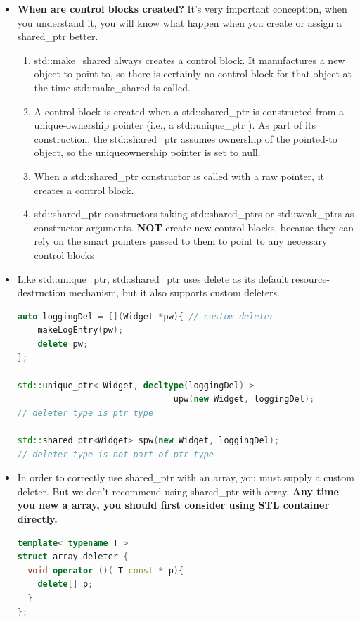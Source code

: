 \documentclass[a4paper,12pt,twoside]{book}
\begin{document}
\begin{itemize}
\item \textbf{When are control blocks created?}  It's very important conception, when you understand it, you will know what happen when you create or assign a shared\_ptr better. 
		
\begin{enumerate}
\item std::make\_shared  always creates a control block. It manufactures
a new object to point to, so there is certainly no control block for that
object at the time std::make\_shared is called.

\item A control block is created when a std::shared\_ptr is constructed from a
unique-ownership pointer (i.e., a std::unique\_ptr ). As part of its construction, the std::shared\_ptr assumes ownership of the pointed-to object, so the uniqueownership pointer is set to null.

\item When a std::shared\_ptr constructor is called with a raw pointer, it creates a control block.

\item std::shared\_ptr constructors taking std::shared\_ptrs or std::weak\_ptrs as constructor arguments. \textbf{NOT} create new control blocks, because they can rely on the smart pointers passed to them to point to any necessary control blocks

\end{enumerate}


\item Like std::unique\_ptr, std::shared\_ptr uses delete as its default resource-destruction mechanism, but it also supports custom deleters.
\begin{lstlisting}[frame=single, language=c++]
auto loggingDel = [](Widget *pw){ // custom deleter
	makeLogEntry(pw);
	delete pw;
};

std::unique_ptr< Widget, decltype(loggingDel) >
                               upw(new Widget, loggingDel);
// deleter type is ptr type

std::shared_ptr<Widget> spw(new Widget, loggingDel);
// deleter type is not part of ptr type
\end{lstlisting}

\item In order to correctly use shared\_ptr with an array, you must supply a custom deleter. But we don't recommend using shared\_ptr with array. \textbf{Any time you new a array, you should first consider using STL container directly.}
\begin{lstlisting}[frame=single, language=c++]
template< typename T >
struct array_deleter {
  void operator ()( T const * p){
    delete[] p;
  }
};


\end{lstlisting}
\end{itemize}
\end{document}
